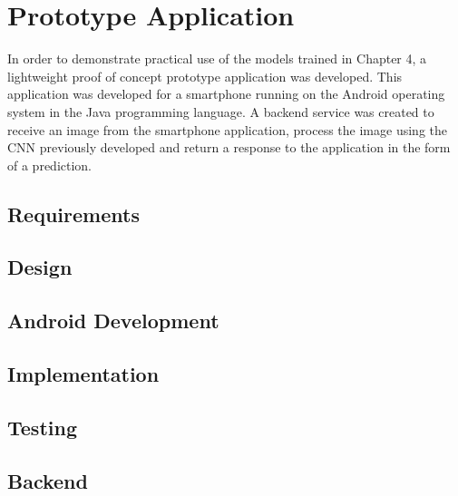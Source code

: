 \chapter{Prototype Application}
\label{prototype}
In order to demonstrate practical use of the models trained in Chapter 4, a lightweight proof of concept prototype application was developed.
This application was developed for a smartphone running on the Android operating system in the Java programming language.
A backend service was created to receive an image from the smartphone
application, process the image using the CNN previously developed and return a
response to the application in the form of a prediction.

\section{Requirements}


\section{Design}


\section{Android Development}


\section{Implementation}


\section{Testing}


\section{Backend}
